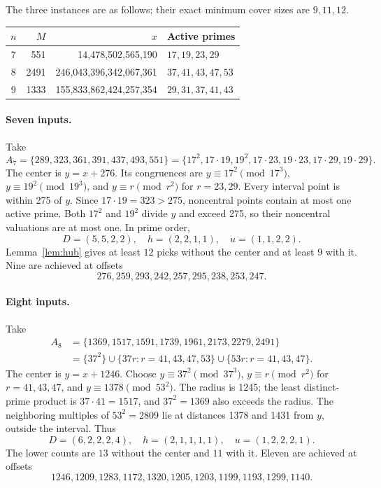 \documentclass[11pt,a4paper]{article}
\begin{document}
The three instances are as follows; their exact minimum cover sizes are $9,11,12$.
\begin{center}\small
\begin{tabular}{@{}crrl@{}}
\toprule
$n$&$M$&$x$&Active primes\\
\midrule
7&551&14,478,502,565,190&$17,19,23,29$\\
8&2491&246,043,396,342,067,361&$37,41,43,47,53$\\
9&1333&155,833,862,424,257,354&$29,31,37,41,43$\\
\bottomrule
\end{tabular}
\end{center}

\paragraph{Seven inputs.}
Take
\[
 A_7=\{289,323,361,391,437,493,551\}
     =\{17^2,17\cdot19,19^2,17\cdot23,19\cdot23,17\cdot29,19\cdot29\}.
\]
The center is $y=x+276$. Its congruences are $y\equiv17^2\pmod{17^3}$, $y\equiv19^2\pmod{19^3}$, and $y\equiv r\pmod{r^2}$ for $r=23,29$. Every interval point is within 275 of $y$. Since $17\cdot19=323>275$, noncentral points contain at most one active prime. Both $17^2$ and $19^2$ divide $y$ and exceed 275, so their noncentral valuations are at most one. In prime order,
\[
 D=(5,5,2,2),\quad h=(2,2,1,1),\quad u=(1,1,2,2).
\]
Lemma~\ref{lem:hub} gives at least $12$ picks without the center and at least $9$ with it. Nine are achieved at offsets
\[
 276,259,293,242,257,295,238,253,247.
\]

\paragraph{Eight inputs.}
Take
\begin{align*}
 A_8&=\{1369,1517,1591,1739,1961,2173,2279,2491\}\\
 &=\{37^2\}\cup\{37r:r=41,43,47,53\}\cup\{53r:r=41,43,47\}.
\end{align*}
The center is $y=x+1246$. Choose $y\equiv37^2\pmod{37^3}$, $y\equiv r\pmod{r^2}$ for $r=41,43,47$, and $y\equiv1378\pmod{53^2}$. The radius is 1245; the least distinct-prime product is $37\cdot41=1517$, and $37^2=1369$ also exceeds the radius. The neighboring multiples of $53^2=2809$ lie at distances 1378 and 1431 from $y$, outside the interval. Thus
\[
 D=(6,2,2,2,4),\quad h=(2,1,1,1,1),\quad u=(1,2,2,2,1).
\]
The lower counts are $13$ without the center and $11$ with it. Eleven are achieved at offsets
\[
 1246,1209,1283,1172,1320,1205,1203,1199,1193,1299,1140.
\]
\end{document}
